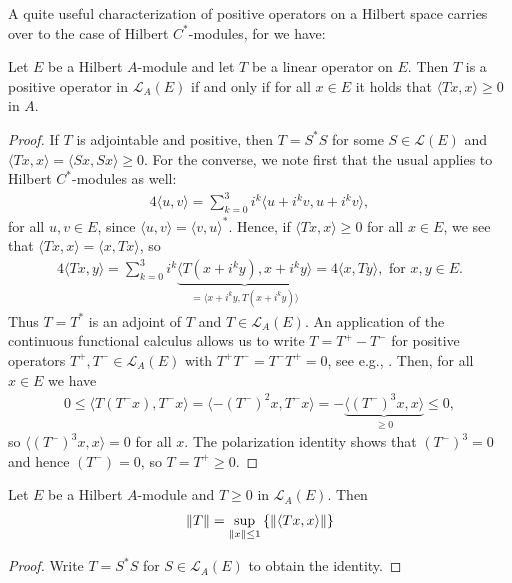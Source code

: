 A quite useful characterization of positive operators on a Hilbert space carries over to the case of Hilbert $C^*$-modules, for we have:
\begin{lemma}
	Let $E$ be a Hilbert $A$-module and let $T$ be a linear operator on $E$. Then $T$ is a positive operator in $\mathcal{L}_A(E)$ if and only if for all $x \in E$ it holds that $\langle Tx,x \rangle \geq 0$ in $A$.
	\label{mult:Tpos}
\end{lemma}
\begin{proof}
	If $T$ is adjointable and positive, then $T=S^*S$ for some $S \in \mathcal{L}(E)$ and $\langle Tx,x\rangle = \langle Sx,Sx\rangle\geq 0$. For the converse, we note first that the usual  applies to Hilbert $C^*$-modules as well:
	\begin{align*}
		4\langle u, v\rangle = \sum_{k=0}^3 i^{k} \langle u+i^kv,u+i^kv\rangle,
	\end{align*}
	for all $u,v \in E$, since $ \langle u,v \rangle = \langle v,u\rangle ^*$. Hence, if $\langle Tx , x \rangle \geq 0$ for all $x \in E$, we see that $\langle Tx,x\rangle = \langle x,Tx\rangle$, so
	\begin{align*}
		4 \langle Tx,y\rangle = \sum_{k=0}^3 i^k \underbrace{\langle T(x+i^ky),x+i^ky\rangle}_{=\langle x+i^ky,T(x+i^ky)\rangle} = 4 \langle x,Ty\rangle, \text{ for } x,y \in E.
	\end{align*}
	Thus $T=T^*$ is an adjoint of $T$ and $T \in \mathcal{L}_A(E)$. An application of the continuous functional calculus allows us to write $T=T^+-T^-$ for positive operators $T^+,T^- \in \mathcal{L}_A(E)$ with $T^+T^-=T^-T^+=0$, see e.g., \cite[Theorem 11.2]{zhu}. Then, for all $x \in E$ we have
	\begin{align*}
		0 \leq \langle T (T^-x),T^{-}x \rangle = \langle -(T^-)^2x,T^-x\rangle = -\underbrace{\langle (T^-)^3x,x\rangle}_{\geq 0 } \leq 0,
	\end{align*}
	so $\langle (T^-)^3 x,x \rangle = 0$ for all $x$. The polarization identity shows that $(T^-)^3=0$ and hence $(T^-)=0$, so $T=T^+\geq 0$.
\end{proof}
\begin{corollary}
	Let $E$ be a Hilbert $A$-module and $T \geq 0$ in $\mathcal{L}_A(E)$. Then
	\begin{align*}
		\left\lVert T \right\rVert = \sup_{\left\lVert x \right\rVert \leq 1}\left\{ \left\lVert \langle Tx,x\rangle \right\rVert \right\}
	\end{align*}
	\label{mult:normposT}
\end{corollary}
\begin{proof}
	Write $T=S^*S$ for $S \in \mathcal{L}_A(E)$ to obtain the identity.
\end{proof}


